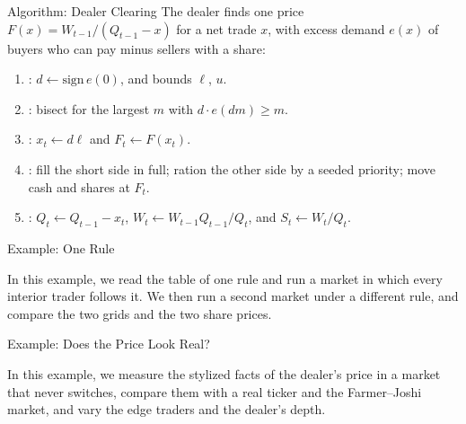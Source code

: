 \documentclass[aspectratio=169,11pt]{beamer}
\newcommand{\repo}{https://github.com/varnerlab/CHEME-5660-CourseRepository-Fall-2026/blob/main/lectures/week-12/L12b}
\begin{document}
\begin{frame}{Algorithm: Dealer Clearing}
  The dealer finds one price $F(x)=W_{t-1}/(Q_{t-1}-x)$ for a net trade $x$, with
  excess demand $e(x)$ of buyers who can pay minus sellers with a share:
  \begin{enumerate}\setlength{\itemsep}{0.3em}
    \item {}: $d\gets\text{sign}\,e(0)$, and bounds $\ell$, $u$.
    \item {}: bisect for the largest $m$ with $d\cdot e(dm)\geq m$.
    \item {}: $x_{t}\gets d\ell$ and $F_{t}\gets F(x_{t})$.
    \item {}: fill the short side in full; ration the other
      side by a seeded priority; move cash and shares at $F_{t}$.
    \item {}: $Q_{t}\gets Q_{t-1}-x_{t}$, $W_{t}\gets W_{t-1}Q_{t-1}/Q_{t}$,
      and $S_{t}\gets W_{t}/Q_{t}$.
  \end{enumerate}
\end{frame}

\begin{frame}{Example: One Rule}
  \vspace{0.3em}
  {\normalsize\textbf{}\par\small
  \href{\repo/CHEME-5660-L12b-Example-Wolfram-Rules-Fall-2026.ipynb}{}}

  \vspace{0.8em}
  In this example, we read the table of one rule and run a market in which every
  interior trader follows it. We then run a second market under a different rule,
  and compare the two grids and the two share prices.
\end{frame}

\begin{frame}{Example: Does the Price Look Real?}
  \vspace{0.3em}
  {\normalsize\textbf{}\par\small
  \href{\repo/CHEME-5660-L12b-Example-Wolfram-StylizedFacts-Fall-2026.ipynb}{}}

  \vspace{0.8em}
  In this example, we measure the stylized facts of the dealer's price in a market
  that never switches, compare them with a real ticker and the Farmer--Joshi
  market, and vary the edge traders and the dealer's depth.
\end{frame}
\end{document}
